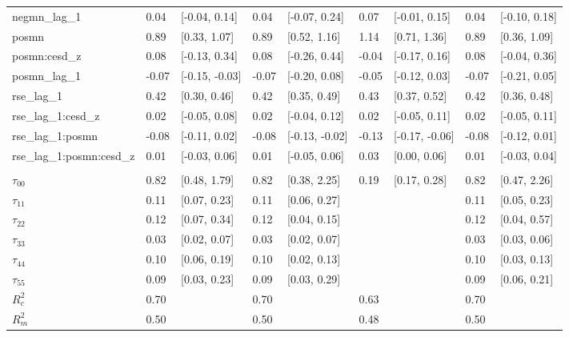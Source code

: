 \documentclass[]{article}
\begin{document}
\begin{table}[H]
\begin{tabular}{lllllllll}
\hspace{1em}negmn\_lag\_1 & 0.04 & [-0.04, 0.14] & 0.04 & [-0.07, 0.24] & 0.07 & [-0.01, 0.15] & 0.04 & [-0.10, 0.18]\\
\hspace{1em}posmn & 0.89 & [0.33, 1.07] & 0.89 & [0.52, 1.16] & 1.14 & [0.71, 1.36] & 0.89 & [0.36, 1.09]\\
\hspace{1em}posmn:cesd\_z & 0.08 & [-0.13, 0.34] & 0.08 & [-0.26, 0.44] & -0.04 & [-0.17, 0.16] & 0.08 & [-0.04, 0.36]\\
\hspace{1em}posmn\_lag\_1 & -0.07 & [-0.15, -0.03] & -0.07 & [-0.20, 0.08] & -0.05 & [-0.12, 0.03] & -0.07 & [-0.21, 0.05]\\
\hspace{1em}rse\_lag\_1 & 0.42 & [0.30, 0.46] & 0.42 & [0.35, 0.49] & 0.43 & [0.37, 0.52] & 0.42 & [0.36, 0.48]\\
\hspace{1em}rse\_lag\_1:cesd\_z & 0.02 & [-0.05, 0.08] & 0.02 & [-0.04, 0.12] & 0.02 & [-0.05, 0.11] & 0.02 & [-0.05, 0.11]\\
\hspace{1em}rse\_lag\_1:posmn & -0.08 & [-0.11, 0.02] & -0.08 & [-0.13, -0.02] & -0.13 & [-0.17, -0.06] & -0.08 & [-0.12, 0.01]\\
\hspace{1em}rse\_lag\_1:posmn:cesd\_z & 0.01 & [-0.03, 0.06] & 0.01 & [-0.05, 0.06] & 0.03 & [0.00, 0.06] & 0.01 & [-0.03, 0.04]\\
\addlinespace[0.3em]
\multicolumn{9}{l}{\textbf{Random}}\\
\hspace{1em}$\tau_{00}$ & 0.82 & [0.48, 1.79] & 0.82 & [0.38, 2.25] & 0.19 & [0.17, 0.28] & 0.82 & [0.47, 2.26]\\
\hspace{1em}$\tau_{11}$ & 0.11 & [0.07, 0.23] & 0.11 & [0.06, 0.27] &  &  & 0.11 & [0.05, 0.23]\\
\hspace{1em}$\tau_{22}$ & 0.12 & [0.07, 0.34] & 0.12 & [0.04, 0.15] &  &  & 0.12 & [0.04, 0.57]\\
\hspace{1em}$\tau_{33}$ & 0.03 & [0.02, 0.07] & 0.03 & [0.02, 0.07] &  &  & 0.03 & [0.03, 0.06]\\
\hspace{1em}$\tau_{44}$ & 0.10 & [0.06, 0.19] & 0.10 & [0.02, 0.13] &  &  & 0.10 & [0.03, 0.13]\\
\hspace{1em}$\tau_{55}$ & 0.09 & [0.03, 0.23] & 0.09 & [0.03, 0.29] &  &  & 0.09 & [0.06, 0.21]\\
$R^2_c$ & 0.70 &  & 0.70 &  & 0.63 &  & 0.70 & \\
$R^2_m$ & 0.50 &  & 0.50 &  & 0.48 &  & 0.50 & \\
\bottomrule
\end{tabular}
\end{table}
\end{document}
